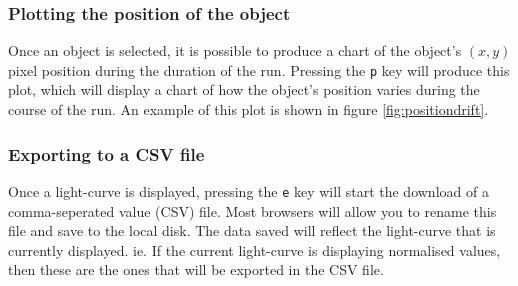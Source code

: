 \subsubsection{Plotting the position of the object}
Once an object is selected, it is possible to produce a chart of the object's $(x, y)$ pixel position during the duration of the run. Pressing the \texttt{p} key will produce this plot, which will display a chart of how the object's position varies during the course of the run. An example of this plot is shown in figure \ref{fig:positiondrift}.

\subsubsection{Exporting to a CSV file}
Once a light-curve is displayed, pressing the \texttt{e} key will start the download of a comma-seperated value (CSV) file. Most browsers will allow you to rename this file and save to the local disk. The data saved will reflect the light-curve that is currently displayed. ie. If the current light-curve is displaying normalised values, then these are the ones that will be exported in the CSV file.


